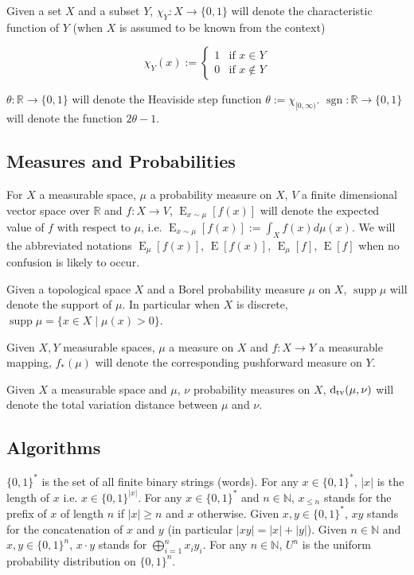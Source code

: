 \documentclass{article}
\numberwithin{equation}{section}
\theoremstyle{definition}
\theoremstyle{plain}
\newcommand{\Words}{{\{ 0, 1 \}^*}}
\newcommand{\WordsLen}[1]{{\{ 0, 1 \}^{#1}}}
\newcommand{\Bool}{\{0,1\}}
\DeclareMathOperator{\Sgn}{sgn}
\DeclareMathOperator{\Supp}{supp}
\DeclareMathOperator{\E}{E}
\newcommand{\Dtv}{\operatorname{d}_{\textnormal{tv}}}
\newcommand{\Nats}{\mathbb{N}}
\newcommand{\Reals}{\mathbb{R}}
\newcommand{\Abs}[1]{\lvert #1 \rvert}
\begin{document}
Given a set $X$ and a subset $Y$, $\chi_Y: X \rightarrow \Bool$ will denote the characteristic function of $Y$ (when $X$ is assumed to be known from the context)

$$\chi_Y(x):=\begin{cases}1 & \text{if } x \in Y \\ 0 & \text{if } x \not\in Y \end{cases}$$

$\theta: \Reals \rightarrow \Bool$ will denote the Heaviside step function $\theta:=\chi_{[0,\infty)}$. ${\Sgn: \Reals \rightarrow \Bool}$ will denote the function $2 \theta - 1$.
\subsection{Measures and Probabilities}

For $X$ a measurable space, $\mu$ a probability measure on $X$, $V$ a finite dimensional vector space over $\Reals$ and $f: X \rightarrow V$, $\E_{x \sim \mu}[f(x)]$ will denote the expected value of $f$ with respect to $\mu$, i.e. $\E_{x \sim \mu}[f(x)] := \int_X f(x) d\mu(x)$. We will the abbreviated notations $\E_\mu[f(x)]$, $\E[f(x)]$, $\E_\mu[f]$, $\E[f]$ when no confusion is likely to occur.

Given a topological space $X$ and a Borel probability measure $\mu$ on $X$, $\Supp \mu$ will denote the support of $\mu$. In particular when $X$ is discrete, ${\Supp \mu = \{x \in X \mid \mu(x) > 0\}}$.

Given $X,Y$ measurable spaces, $\mu$ a measure on $X$ and $f: X \rightarrow Y$ a measurable mapping, $f_*(\mu)$ will denote the corresponding pushforward measure on $Y$.

Given $X$ a measurable space and $\mu$, $\nu$ probability measures on $X$, $\Dtv(\mu,\nu)$ will denote the total variation distance between $\mu$ and $\nu$.

\subsection{Algorithms}

$\Words$ is the set of all finite binary strings (words). For any $x \in \Words$, $\Abs{x}$ is the length of $x$ i.e. $x \in \WordsLen{\Abs{x}}$. For any $x \in \Words$ and $n \in \Nats$, $x_{\leq n}$ stands for the prefix of $x$ of length $n$ if $\Abs{x} \geq n$ and $x$ otherwise. Given $x,y \in \Words$, $xy$ stands for the concatenation of $x$ and $y$ (in particular $\Abs{xy}=\Abs{x}+\Abs{y}$). Given $n \in \Nats$ and $x,y \in \WordsLen{n}$, $x \cdot y$ stands for $\bigoplus_{i=1}^n x_i y_i$. For any $n \in \Nats$, $U^n$ is the uniform probability distribution on $\WordsLen{n}$.
\end{document}
